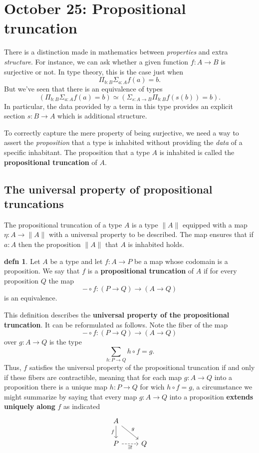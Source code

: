\documentclass{amsart}
\theoremstyle{theorem}
\theoremstyle{definition}
\newtheorem*{defn}{defn}
\theoremstyle{remark}
\newcommand{\0}{\mathbbe{0}}
\newcommand{\1}{\mathbbe{1}}
\newcommand{\2}{\mathbbe{2}}
\newcommand{\3}{\mathbbe{3}}
\newcommand{\4}{\mathbbe{4}}
\newcommand{\mere}[1]{\|{#1}\|}
\begin{document}
\section*{October 25: Propositional truncation}

There is a distinction made in mathematics between \emph{properties} and extra \emph{structure}. For instance, we can ask whether a given function $f \colon A \to B$ is surjective or not. In type theory, this is the case just when 
\[ \Pi_{b:B} \Sigma_{a:A} f(a)=b.\]
But we've seen that there is an equivalence of types 
\[ \left( \Pi_{b:B} \Sigma_{a:A} f(a)=b \right) \simeq \left( \Sigma_{s:A \to B} \Pi_{b:B} f(s(b))=b \right).\]
In particular, the data provided by a term in this type provides an explicit section $s : B \to A$ which is additional structure.

To correctly capture the mere property of being surjective, we need a way to assert the \emph{proposition} that a type is inhabited without providing the \emph{data} of a specific inhabitant. The proposition that a type $A$ is inhabited is called the \textbf{propositional truncation} of $A$.

\subsection*{The universal property of propositional truncations}

The propositional truncation of a type $A$ is a type $\mere{A}$ equipped with a map $\eta \colon A \to \mere{A}$ with a universal property to be described. The map ensures that if $a :A$ then the proposition $\mere{A}$ that $A$ is inhabited holds.

\begin{defn} Let $A$ be a type and let $f \colon A \to P$ be a map whose codomain is a proposition. We say that $f$ is a \textbf{propositional truncation} of $A$ if for every proposition $Q$ the map
\[ - \circ f : (P \to Q) \to (A \to Q)\]
is an equivalence.
\end{defn}

This definition describes the \textbf{universal property of the propositional truncation}. It can be reformulated as follows. Note the fiber of the map 
\[ - \circ f : (P \to Q) \to (A \to Q)\]
over $g : A \to Q$ is the type
\[ \sum_{h : P \to Q} h \circ f = g.\]
Thus, $f$ satisfies the universal property of the propositional truncation if and only if these fibers are contractible, meaning that for each map $g : A \to Q$ into a proposition there is a unique map $h : P \to Q$ for wich $h \circ f = g$, a circumstance we might summarize by saying that every map $g : A \to Q$ into a proposition \textbf{extends uniquely along} $f$ as indicated
\[
\begin{tikzcd} A \arrow[dr, "g"] \arrow[d, "f"'] \\ P \arrow[r, dashed, "\exists !"'] & Q
\end{tikzcd}
\]
\end{document}

